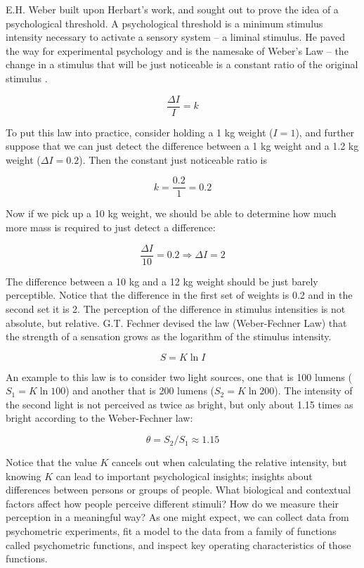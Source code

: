 \documentclass[11pt, oneside, openany]{scrbook}
\begin{document}
E.H. Weber built upon Herbart's work, and sought out to prove the idea of a psychological threshold. A psychological threshold is a minimum stimulus intensity necessary to activate a sensory system -- a liminal stimulus. He paved the way for experimental psychology and is the namesake of Weber's Law -- the change in a stimulus that will be just noticeable is a constant ratio of the original stimulus \citep{britannica2014editors}.

\[\frac{\Delta I}{I} = k\]

To put this law into practice, consider holding a 1 kg weight (\(I = 1\)), and further suppose that we can just detect the difference between a 1 kg weight and a 1.2 kg weight (\(\Delta I = 0.2\)). Then the constant just noticeable ratio is

\[k = \frac{0.2}{1} = 0.2\]

Now if we pick up a 10 kg weight, we should be able to determine how much more mass is required to just detect a difference:

\[\frac{\Delta I}{10} = 0.2 \Rightarrow \Delta I = 2\]

The difference between a 10 kg and a 12 kg weight should be just barely perceptible. Notice that the difference in the first set of weights is 0.2 and in the second set it is 2. The perception of the difference in stimulus intensities is not absolute, but relative. G.T. Fechner devised the law (Weber-Fechner Law) that the strength of a sensation grows as the logarithm of the stimulus intensity.

\[S = K \ln I\]

An example to this law is to consider two light sources, one that is 100 lumens (\(S_1 = K \ln 100\)) and another that is 200 lumens (\(S_2 = K \ln 200\)). The intensity of the second light is not perceived as twice as bright, but only about 1.15 times as bright according to the Weber-Fechner law:

\[\theta = S_2 / S_1 \approx 1.15\]

Notice that the value \(K\) cancels out when calculating the relative intensity, but knowing \(K\) can lead to important psychological insights; insights about differences between persons or groups of people. What biological and contextual factors affect how people perceive different stimuli? How do we measure their perception in a meaningful way? As one might expect, we can collect data from psychometric experiments, fit a model to the data from a family of functions called psychometric functions, and inspect key operating characteristics of those functions.
\end{document}
